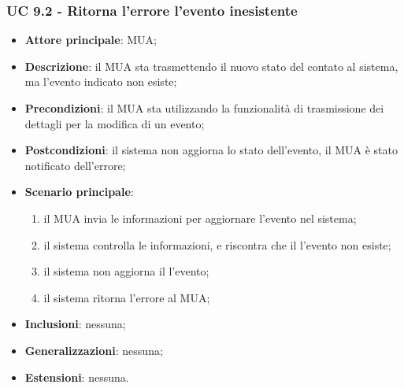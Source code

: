 \subsubsection{UC 9.2 - Ritorna l'errore l'evento inesistente} \label{sec:UC9.2}
    \begin{itemize}
        \item \textbf{Attore principale}: MUA;
        \item \textbf{Descrizione}: il MUA sta trasmettendo il nuovo stato del contato al sistema, ma l'evento indicato non esiste;
        \item \textbf{Precondizioni}: il MUA sta utilizzando la funzionalità di trasmissione dei dettagli per la modifica di un evento;
        \item \textbf{Postcondizioni}: il sistema non aggiorna lo stato dell'evento, il MUA è stato notificato dell'errore;
        \item \textbf{Scenario principale}:
            \begin{enumerate}
                \item il MUA invia le informazioni per aggiornare l'evento nel sistema;
                \item il sistema controlla le informazioni, e riscontra che il l'evento non esiste;
                \item il sistema non aggiorna il l'evento;
                \item il sistema ritorna l'errore al MUA;
            \end{enumerate}
        \item \textbf{Inclusioni}: nessuna;
        \item \textbf{Generalizzazioni}: nessuna;
        \item \textbf{Estensioni}: nessuna.
    \end{itemize}

